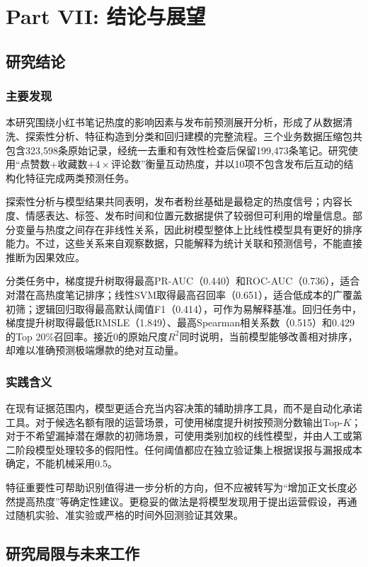 \part{Part VII: 结论与展望}

\chapter{研究结论}

\section{主要发现}
本研究围绕小红书笔记热度的影响因素与发布前预测展开分析，形成了从数据清洗、探索性分析、特征构造到分类和回归建模的完整流程。三个业务数据压缩包共包含323,598条原始记录，经统一去重和有效性检查后保留199,473条笔记。研究使用“点赞数+收藏数+$4\times$评论数”衡量互动热度，并以10项不包含发布后互动的结构化特征完成两类预测任务。

探索性分析与模型结果共同表明，发布者粉丝基础是最稳定的热度信号；内容长度、情感表达、标签、发布时间和位置元数据提供了较弱但可利用的增量信息。部分变量与热度之间存在非线性关系，因此树模型整体上比线性模型具有更好的排序能力。不过，这些关系来自观察数据，只能解释为统计关联和预测信号，不能直接推断为因果效应。

分类任务中，梯度提升树取得最高PR-AUC（0.440）和ROC-AUC（0.736），适合对潜在高热度笔记排序；线性SVM取得最高召回率（0.651），适合低成本的广覆盖初筛；逻辑回归取得最高默认阈值F1（0.414），可作为易解释基准。回归任务中，梯度提升树取得最低RMSLE（1.849）、最高Spearman相关系数（0.515）和0.429的Top 20\%召回率。接近0的原始尺度$R^2$同时说明，当前模型能够改善相对排序，却难以准确预测极端爆款的绝对互动量。

\section{实践含义}
在现有证据范围内，模型更适合充当内容决策的辅助排序工具，而不是自动化承诺工具。对于候选名额有限的运营场景，可使用梯度提升树按预测分数输出Top-$K$；对于不希望漏掉潜在爆款的初筛场景，可使用类别加权的线性模型，并由人工或第二阶段模型处理较多的假阳性。任何阈值都应在独立验证集上根据误报与漏报成本确定，不能机械采用0.5。

特征重要性可帮助识别值得进一步分析的方向，但不应被转写为“增加正文长度必然提高热度”等确定性建议。更稳妥的做法是将模型发现用于提出运营假设，再通过随机实验、准实验或严格的时间外回测验证其效果。

\chapter{研究局限与未来工作}

